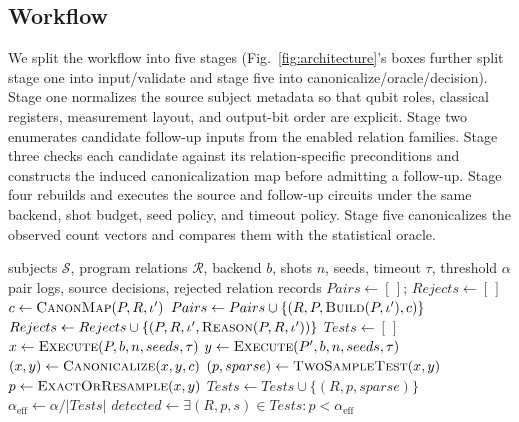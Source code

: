 \subsection{Workflow}

We split the workflow into five stages (Fig.~\ref{fig:architecture}'s boxes further split stage one into input/validate and stage five into canonicalize/oracle/decision). Stage one normalizes the source subject metadata so that qubit roles, classical registers, measurement layout, and output-bit order are explicit. Stage two enumerates candidate follow-up inputs from the enabled relation families. Stage three checks each candidate against its relation-specific preconditions and constructs the induced canonicalization map before admitting a follow-up. Stage four rebuilds and executes the source and follow-up circuits under the same backend, shot budget, seed policy, and timeout policy. Stage five canonicalizes the observed count vectors and compares them with the statistical oracle.

\begin{algorithm}[t]
\caption{QMTester program-level detection pipeline}
\label{alg:qmtester}
\scriptsize
\begin{algorithmic}[1]
\Require subjects $\mathcal{S}$, program relations $\mathcal{R}$, backend $b$, shots $n$, seeds, timeout $\tau$, threshold $\alpha$
\Ensure pair logs, source decisions, rejected relation records
  \State $Pairs \gets [\,]$; $Rejects \gets [\,]$
        \State $c \gets \Call{CanonMap}{P,R,\iota'}$
        \State $Pairs \gets Pairs \cup \{(R,P,\Call{Build}{P,\iota'},c)\}$
      \Else
        \State $Rejects \gets Rejects \cup \{(P,R,\iota',\Call{Reason}{P,R,\iota'})\}$
      \EndIf
    \EndFor
  \EndFor
  \State $Tests \gets [\,]$
    \State $x \gets \Call{Execute}{P,b,n,seeds,\tau}$
    \State $y \gets \Call{Execute}{P',b,n,seeds,\tau}$
    \State $(x,y) \gets \Call{Canonicalize}{x,y,c}$
    \State $(p,sparse) \gets \Call{TwoSampleTest}{x,y}$
      \State $p \gets \Call{ExactOrResample}{x,y}$
    \EndIf
    \State $Tests \gets Tests \cup \{(R,p,sparse)\}$
  \EndFor
  \State $\alpha_{\mathrm{eff}} \gets \alpha/|Tests|$
  \State $detected \gets \exists(R,p,s) \in Tests: p < \alpha_{\mathrm{eff}}$
  \State {}
  \State {}
\EndFor
\end{algorithmic}
\end{algorithm}

